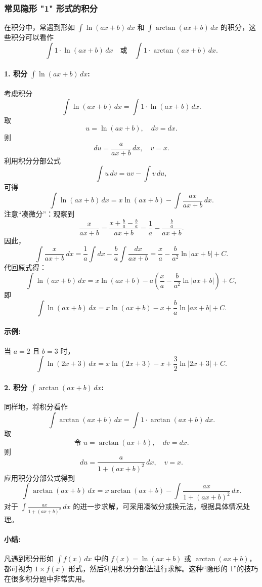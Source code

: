 \documentclass[8pt,a4paper,twoside]{tau-class/tau}
\begin{document}
\subsubsection{常见隐形 "1" 形式的积分}

在积分中，常遇到形如 \(\int \ln(ax+b)\,dx\) 和 \(\int \arctan(ax+b)\,dx\) 的积分，这些积分可以看作
\[
\int 1 \cdot \ln(ax+b)\,dx \quad \text{或} \quad \int 1 \cdot \arctan(ax+b)\,dx.
\]

\paragraph{1. 积分 \(\int \ln(ax+b)\,dx\):}  
考虑积分
\[
\int \ln(ax+b)\,dx = \int 1 \cdot \ln(ax+b)\,dx.
\]
取
\[
u = \ln(ax+b), \quad dv = dx.
\]
则
\[
du = \frac{a}{ax+b}\,dx, \quad v = x.
\]
利用积分分部公式
\[
\int u\,dv = uv − \int v\,du,
\]
可得
\[
\int \ln(ax+b)\,dx = x\ln(ax+b) − \int \frac{a x}{ax+b}\,dx.
\]
注意“凑微分”：观察到
\[
\frac{x}{ax+b} = \frac{x + \tfrac{b}{a} − \tfrac{b}{a}}{ax+b} 
= \frac{1}{a} − \frac{\tfrac{b}{a}}{ax+b}.
\]
因此，
\[
\int \frac{x}{ax+b}\,dx = \frac{1}{a}\int dx − \frac{b}{a}\int \frac{dx}{ax+b}
= \frac{x}{a} − \frac{b}{a^2}\ln|ax+b| + C.
\]
代回原式得：
\[
\int \ln(ax+b)\,dx = x\ln(ax+b) − a\left(\frac{x}{a} − \frac{b}{a^2}\ln|ax+b|\right) + C,
\]
即
\[
\boxed{\int \ln(ax+b)\,dx = x\ln(ax+b) − x + \frac{b}{a}\ln|ax+b| + C.}
\]

\paragraph{示例:} 当 \(a=2\) 且 \(b=3\) 时，
\[
\int \ln(2x+3)\,dx = x\ln(2x+3) − x + \frac{3}{2}\ln|2x+3| + C.
\]

\paragraph{2. 积分 \(\int \arctan(ax+b)\,dx\):}  
同样地，将积分看作
\[
\int \arctan(ax+b)\,dx = \int 1 \cdot \arctan(ax+b)\,dx.
\]
取
\[
\textbf{令 } u = \arctan(ax+b), \quad dv = dx.
\]
则
\[
du = \frac{a}{1+(ax+b)^2}\,dx, \quad v = x.
\]
应用积分分部公式得到
\[
\int \arctan(ax+b)\,dx = x\arctan(ax+b) − \int \frac{ax}{1+(ax+b)^2}\,dx.
\]
对于 \(\int \frac{ax}{1+(ax+b)^2}\,dx\) 的进一步求解，可采用凑微分或换元法，根据具体情况处理。

\paragraph{小结:}  
凡遇到积分形如 \(\int f(x)\,dx\) 中的 \(f(x)=\ln(ax+b)\) 或 \(\arctan(ax+b)\)，都可视为 \(1 \times f(x)\) 形式，然后利用积分分部法进行求解。这种“隐形的 1”的技巧在很多积分题中非常实用。
\end{document}
